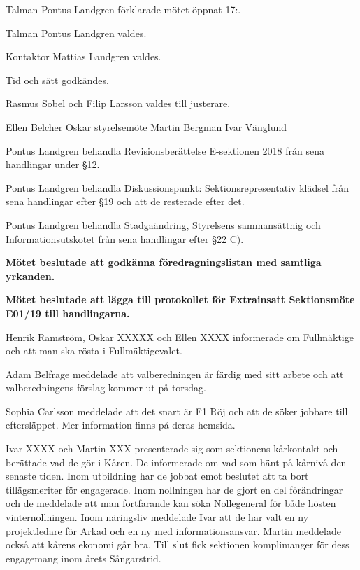 \documentclass[10pt]{article}
\def\mo{Pontus Landgren}
\def\ms{Mattias Landgren}
\begin{document}
\begin{paragrafer}
Talman {\mo} förklarade mötet öppnat 17:.

Talman {\mo} valdes.

Kontaktor {\ms} valdes.

Tid och sätt godkändes.

Rasmus Sobel och Filip Larsson valdes till justerare.

\valavj

Ellen Belcher
Oskar styrelsemöte
Martin Bergman
Ivar Vänglund


Pontus Landgren \ypa behandla Revisionsberättelse E-sektionen 2018 från sena handlingar under \S12. 

Pontus Landgren \ypa behandla Diskussionspunkt: Sektionsrepresentativ klädsel från sena handlingar efter \S19 och att de resterade efter det. 

Pontus Landgren \ypa behandla Stadgaändring, Styrelsens sammansättnig och Informationsutskotet från sena handlingar efter \S22 C). 

\textbf{Mötet beslutade att godkänna föredragningslistan med samtliga yrkanden.}


\textbf{Mötet beslutade att lägga till protokollet för Extrainsatt Sektionsmöte E01/19 till handlingarna.}

Henrik Ramström, Oskar XXXXX och Ellen XXXX informerade om Fullmäktige och att man ska rösta i Fullmäktigevalet. 

Adam Belfrage meddelade att valberedningen är färdig med sitt arbete och att valberedningens förslag kommer ut på torsdag. 

Sophia Carlsson meddelade att det snart är F1 Röj och att de söker jobbare till eftersläppet. Mer information finns på deras hemsida. 

Ivar XXXX och Martin XXX presenterade sig som sektionens kårkontakt och berättade vad de gör i Kåren. 
De informerade om vad som hänt på kårnivå den senaste tiden. 
Inom utbildning har de jobbat emot beslutet att ta bort tillägsmeriter för engagerade. Inom nollningen har de gjort en del förändringar och de meddelade att man fortfarande kan söka Nollegeneral för både hösten vinternollningen.  
Inom näringsliv meddelade Ivar att de har valt en ny projektledare för Arkad och en ny med informationsansvar.
Martin meddelade också att kårens ekonomi går bra. Till slut fick sektionen komplimanger för dess engagemang inom årets Sångarstrid. 


\end{paragrafer}
\end{document}
